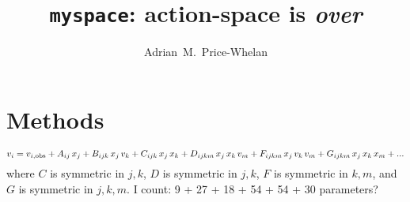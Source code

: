 \documentclass[modern]{aastex62}
\begin{document}
\sloppy\sloppypar\raggedbottom\frenchspacing %

\title{\textbf{\texttt{myspace}: action-space is \textsl{over}}}

\author{Adrian~M.~Price-Whelan}


\begin{abstract}\noindent %
\end{abstract}







\section{Methods}
\label{sec:methods}

\begin{equation}
    v_i = v_{i, {\rm obs}} + A_{ij}\,x_j +
        B_{ijk}\,x_j\,v_k + C_{ijk}\,x_j\,x_k +
        D_{ijkm}\,x_j\,x_k\,v_m + F_{ijkm}\,x_j\,v_k\,v_m +
        G_{ijkm}\,x_j\,x_k\,x_m +
        ...
\end{equation}
where $C$ is symmetric in $j, k$, $D$ is symmetric in $j, k$, $F$ is symmetric
in $k, m$, and $G$ is symmetric in $j, k, m$.
I count: 9 + 27 + 18 + 54 + 54 + 30 parameters?
\end{document}

